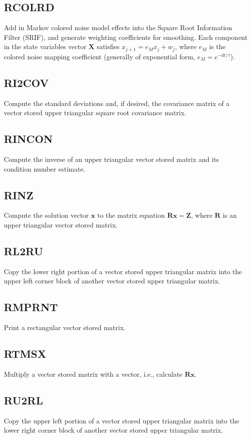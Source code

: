 \documentclass[./doc.tex]{subfiles}
\begin{document}
\subsection{RCOLRD}
Add in Markov colored noise model effects into the Square Root Information Filter (SRIF), and generate weighting
coefficients for smoothing. Each component in the state variables vector \(\bm{X}\) satisfies
\(x_{j+1} = e_M x_j + w_j\), where \(e_M\) is the colored noise mapping coefficient (generally of exponential
form, \(e_M = e^{-dt/\tau}\)).

\subsection{RI2COV}
Compute the standard deviations and, if desired, the covariance matrix of a vector stored upper triangular
square root covariance matrix.

\subsection{RINCON}
Compute the inverse of an upper triangular vector stored matrix and its condition number estimate.

\subsection{RINZ}
Compute the solution vector \(\bm{x}\) to the matrix equation \(\bm{R} \bm{x} = \bm{Z}\), where
\(\bm{R}\) is an upper triangular vector stored matrix.

\subsection{RL2RU}
Copy the lower right portion of a vector stored upper triangular matrix into the upper left corner
block of another vector stored upper triangular matrix.

\subsection{RMPRNT}
Print a rectangular vector stored matrix.

\subsection{RTMSX}
Multiply a vector stored matrix with a vector, i.e., calculate \(\bm{R}\bm{x}\).

\subsection{RU2RL}
Copy the upper left portion of a vector stored upper triangular matrix into the lower right corner
block of another vector stored upper triangular matrix.
\end{document}
